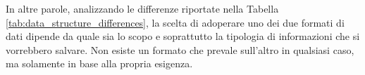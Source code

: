 In altre parole, analizzando le differenze riportate nella Tabella  \ref{tab:data_structure_differences}, la scelta di adoperare uno dei due formati di dati dipende da quale sia lo scopo e soprattutto la tipologia di informazioni che si vorrebbero salvare. Non esiste un formato che prevale sull'altro in qualsiasi caso, ma solamente in base alla propria esigenza.

